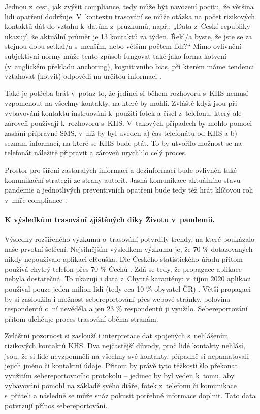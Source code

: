 Jednou z~cest, jak zvýšit compliance, tedy může být navození pocitu, že většina lidí opatření dodržuje. V~kontextu trasování se může otázka na počet rizikových kontaktů dát do vztahu k~datům z~průzkumů, např.: „Data z~České republiky ukazují, že aktuální průměr je 13 kontaktů za týden. Řekl/a byste, že jste se za stejnou dobu setkal/a s~menším, nebo větším počtem lidí?“ Mimo ovlivnění subjektivní normy může tento způsob fungovat také jako forma kotvení (v~anglickém překladu anchoring), kognitivního bias, při kterém máme tendenci vztahovat (kotvit) odpovědi na určitou informaci \cite{Tversky1974}.

Také je potřeba brát v~potaz to, že jedinci si během rozhovoru s~KHS nemusí vzpomenout na všechny kontakty, na které by mohli. Zvláště když jsou při vybavování kontaktů instruováni k~použití fotek a čísel z~telefonu, který ale zároveň používají k~rozhovoru s~KHS. V~takových případech by mohlo pomoci zaslání přípravné SMS, v~níž by byl uveden a) čas telefonátu od KHS a b) seznam informací, na které se KHS bude ptát. To by utvořilo možnost se na telefonát náležitě připravit a zároveň urychlilo celý proces.

Prostor pro šíření zastaralých informací a dezinformací bude ovlivněn také komunikační strategií ze strany autorit. Jasná komunikace aktuálního stavu pandemie a jednotlivých preventivních opatření bude tedy též hrát klíčovou roli v~míře compliance \cite{Hyland-Wood2021}. 

\paragraph*{K výsledkům trasování zjištěných díky Životu v~pandemii.}
Výsledky rozšířeného výzkumu o~trasování potvrdily trendy, na které poukázalo naše prvotní šetření. Nejsilnějším výsledkem výzkumu je, že 70 \% dotazovaných nikdy nepoužívalo aplikaci eRouška. Dle Českého statistického úřadu přitom používá chytrý telefon přes 70 \% Čechů \cite{Mana2020}. Zdá se tedy, že propagace aplikace nebyla dostatečná. To ukazují i data z~Chytré karantény: v~říjnu 2020 aplikaci používal pouze jeden milion lidí (tedy cca 10 \% obyvatel ČR) \cite{Fiser2020}. Větší propagaci by si zasloužila i možnost sebereportování přes webové stránky, polovina respondentů o~ní nevěděla a jen 23 \% respondentů ji využilo. Sebereportování přitom ulehčuje proces trasování oběma stranám. 

Zvláštní pozornost si zaslouží i interpretace dat spojených s~nehlášením rizikových kontaktů KHS. Dva nejčastější důvody, proč lidé kontakty nehlásí, jsou, že si lidé nevzpomněli na všechny své kontakty, případně si nepamatovali jejich jméno či kontaktní údaje. Přitom by právě tyto těžkosti šlo překonat využitím sebereportovacího protokolu -- jedinec by byl veden k~tomu, aby vybavování pomohl na základě svého diáře, fotek z~telefonu či komunikace s~přáteli a následně se může snáz pokusit potřebné informace doplnit. Tato data potvrzují přínos sebereportování.


